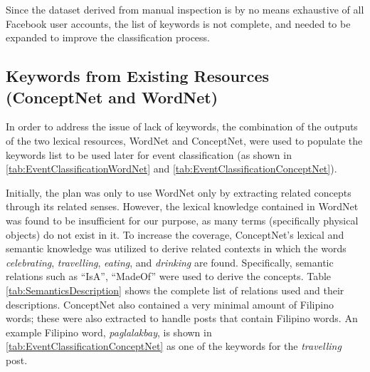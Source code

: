 Since the dataset derived from manual inspection is by no means exhaustive of all Facebook user accounts, the list of keywords is not complete, and needed to be expanded to improve the classification process. 

\subsection{Keywords from Existing Resources (ConceptNet and WordNet)}
In order to address the issue of lack of keywords, the combination of the outputs of the two lexical resources, WordNet and ConceptNet, were used to populate the keywords list to be used later for event classification (as shown in \ref{tab:EventClassificationWordNet} and \ref{tab:EventClassificationConceptNet}). 

Initially, the plan was only to use WordNet only by extracting related concepts through its related senses. However, the lexical knowledge contained in WordNet was found to be insufficient for our purpose, as many terms (specifically physical objects) do not exist in it. To increase the coverage, ConceptNet's lexical and semantic knowledge was utilized to derive related contexts in which the words \textit{celebrating}, \textit{travelling}, \textit{eating}, and \textit{drinking} are found. Specifically, semantic relations such as ``IsA”, ``MadeOf” were used to derive the concepts. Table \ref{tab:SemanticsDescription} shows the complete list of relations used and their descriptions.  ConceptNet also contained a very minimal amount of Filipino words; these were also extracted to handle posts that contain Filipino words. An example Filipino word, \textit{paglalakbay}, is shown in \ref{tab:EventClassificationConceptNet} as one of the keywords for the \textit{travelling} post.

